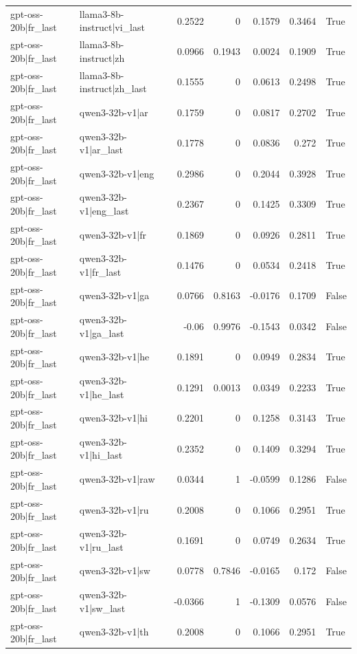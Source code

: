 \begin{table}
\begin{tabular}{l l r r r r l}
gpt-oss-20b|fr_last & llama3-8b-instruct|vi_last & 0.2522 & 0 & 0.1579 & 0.3464 & True \\
gpt-oss-20b|fr_last & llama3-8b-instruct|zh & 0.0966 & 0.1943 & 0.0024 & 0.1909 & True \\
gpt-oss-20b|fr_last & llama3-8b-instruct|zh_last & 0.1555 & 0 & 0.0613 & 0.2498 & True \\
gpt-oss-20b|fr_last & qwen3-32b-v1|ar & 0.1759 & 0 & 0.0817 & 0.2702 & True \\
gpt-oss-20b|fr_last & qwen3-32b-v1|ar_last & 0.1778 & 0 & 0.0836 & 0.272 & True \\
gpt-oss-20b|fr_last & qwen3-32b-v1|eng & 0.2986 & 0 & 0.2044 & 0.3928 & True \\
gpt-oss-20b|fr_last & qwen3-32b-v1|eng_last & 0.2367 & 0 & 0.1425 & 0.3309 & True \\
gpt-oss-20b|fr_last & qwen3-32b-v1|fr & 0.1869 & 0 & 0.0926 & 0.2811 & True \\
gpt-oss-20b|fr_last & qwen3-32b-v1|fr_last & 0.1476 & 0 & 0.0534 & 0.2418 & True \\
gpt-oss-20b|fr_last & qwen3-32b-v1|ga & 0.0766 & 0.8163 & -0.0176 & 0.1709 & False \\
gpt-oss-20b|fr_last & qwen3-32b-v1|ga_last & -0.06 & 0.9976 & -0.1543 & 0.0342 & False \\
gpt-oss-20b|fr_last & qwen3-32b-v1|he & 0.1891 & 0 & 0.0949 & 0.2834 & True \\
gpt-oss-20b|fr_last & qwen3-32b-v1|he_last & 0.1291 & 0.0013 & 0.0349 & 0.2233 & True \\
gpt-oss-20b|fr_last & qwen3-32b-v1|hi & 0.2201 & 0 & 0.1258 & 0.3143 & True \\
gpt-oss-20b|fr_last & qwen3-32b-v1|hi_last & 0.2352 & 0 & 0.1409 & 0.3294 & True \\
gpt-oss-20b|fr_last & qwen3-32b-v1|raw & 0.0344 & 1 & -0.0599 & 0.1286 & False \\
gpt-oss-20b|fr_last & qwen3-32b-v1|ru & 0.2008 & 0 & 0.1066 & 0.2951 & True \\
gpt-oss-20b|fr_last & qwen3-32b-v1|ru_last & 0.1691 & 0 & 0.0749 & 0.2634 & True \\
gpt-oss-20b|fr_last & qwen3-32b-v1|sw & 0.0778 & 0.7846 & -0.0165 & 0.172 & False \\
gpt-oss-20b|fr_last & qwen3-32b-v1|sw_last & -0.0366 & 1 & -0.1309 & 0.0576 & False \\
gpt-oss-20b|fr_last & qwen3-32b-v1|th & 0.2008 & 0 & 0.1066 & 0.2951 & True \\

\end{tabular}
\end{table}
